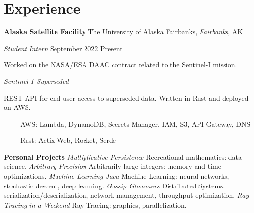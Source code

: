 ﻿\section{Experience}

\textbf{Alaska Satellite Facility}
\hfill
The University of Alaska Fairbanks, \textit{Fairbanks}, AK

\textit{Student Intern}
\hfill
{September 2022 \textendash\! Present}

\bigbreak

Worked on the NASA/ESA DAAC contract related to the Sentinel-I mission.

\bigbreak

\textit{Sentinel-1 Superseded}

REST API for end-user access to superseded data. Written in Rust and deployed on AWS.
\begin{itemize}\setlength\itemsep{-0.15cm}
    \item [-] AWS: Lambda, DynamoDB, Secrets Manager, IAM, S3, API Gateway, DNS
    \item [-] Rust: Actix Web, Rocket, Serde
\end{itemize}

\textbf{Personal Projects}
\bigbreak
\textit{Multiplicative Persistence} \textendash\! Recreational mathematics: data science.
\bigbreak
\textit{Arbitrary Precision} \textendash\! Arbitrarily large integers: memory and time optimizations.
\bigbreak
\textit{Machine Learning Java} \textendash\! Machine Learning: neural networks, stochastic descent, deep learning.
\bigbreak
\textit{Gossip Glommers} \textendash\! Distributed Systems: serialization/deserialization, network management, throughput optimization.
\bigbreak
\textit{Ray Tracing in a Weekend} \textendash\! Ray Tracing: graphics, parallelization.